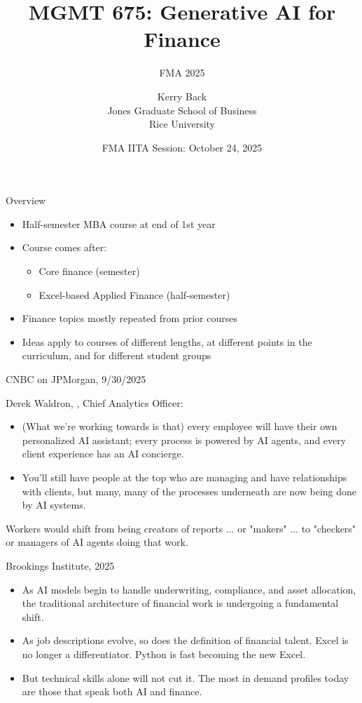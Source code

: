 \documentclass{beamer}
\title{MGMT 675: Generative AI for Finance}
\subtitle{FMA 2025}
\date{FMA IITA Session: October 24, 2025}
\author{Kerry Back\\ 
Jones Graduate School of Business\\
Rice University}
\begin{document}
\initclock

\maketitle


\begin{frame}{Overview}
    \begin{itemize}
    \item Half-semester MBA course at end of 1st year
    \item Course comes after: 
    \begin{itemize}
    \item Core finance (semester) 
    \item Excel-based Applied Finance (half-semester)
    \end{itemize}
    \item Finance topics mostly repeated from prior courses
    \item Ideas apply to courses of different lengths, at different points in the curriculum, and for different student groups
    \end{itemize}

\end{frame}


\begin{frame}{CNBC on JPMorgan, 9/30/2025}

Derek Waldron, , Chief Analytics Officer:
\begin{itemize}
\item (What we're working towards is that) every employee will have their own personalized AI assistant; every process is powered by AI agents, and every client experience has an AI concierge.
\item You'll still have people at the top who are managing and have relationships with clients, but many, many of the processes underneath are now being done by AI systems.
\end{itemize}


Workers would shift from being creators of reports ... or "makers" ... to "checkers" or managers of AI agents doing that work.

\end{frame}

\begin{frame}{Brookings Institute, 2025}

\begin{itemize}
\item As AI models begin to handle underwriting, compliance, and asset allocation, the traditional architecture of financial work is undergoing a fundamental shift.
\item As job descriptions evolve, so does the definition of financial talent. Excel is no longer a differentiator. Python is fast becoming the new Excel. 
\item But technical skills alone will not cut it. The most in demand profiles today are those that speak both AI and finance.
\end{itemize}
\end{frame}
\end{document}
